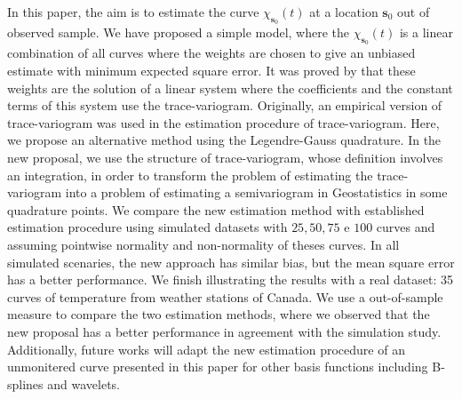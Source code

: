 \documentclass[12pt]{interact}
\theoremstyle{plain}%
\theoremstyle{definition}
\theoremstyle{remark}
\begin{document}
In this paper, the aim is to estimate the curve \(\chi_{\bm{s}_0}(t)\) at a location \(\bm{s}_0\) out of observed sample. We have proposed a simple model, where the \(\chi_{\bm{s}_0}(t)\) is a linear combination of all curves where the weights are chosen to give an unbiased estimate with minimum expected square error. It was proved by \citet{giraldo2011ordinary} that these weights are the solution of a linear system where the coefficients and the constant terms of this system use the trace-variogram. Originally, an empirical version of trace-variogram was used in the estimation procedure of trace-variogram. Here, we propose an alternative method using the Legendre-Gauss quadrature. In the new proposal, we use the structure of trace-variogram, whose definition involves an integration, in order to transform the problem of estimating the trace-variogram into a problem of estimating a semivariogram in Geostatistics in some quadrature points. We compare the new estimation method with established estimation procedure using simulated datasets with \(25,50,75\) e \(100\) curves and assuming pointwise normality and non-normality of theses curves. In all simulated scenaries, the new approach has similar bias, but the mean square error has a better performance. We finish illustrating the results with a real dataset: 35 curves of temperature from weather stations of Canada. We use a out-of-sample measure to compare the two estimation methods, where we observed that the new proposal has a better performance in agreement with the simulation study. Additionally, future works will adapt the new estimation procedure of an unmonitered curve presented in this paper for other basis functions including B-splines and wavelets.

%
\end{document}
